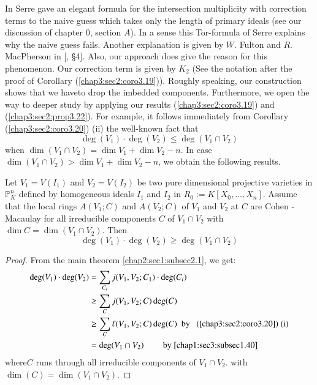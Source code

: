 \setcounter{remark}{26}
\begin{remark}\label{chap3:sec2:rem3.27}
  In \cite{72} Serre gave an elegant formula for the intersection
  multiplicity with correction terms to the naive guess which takes
  only the length of primary ideals (see our discussion of chapter
  $0$, section $A$). In a sense this Tor-formula of Serre explains why
  the  naive guess fails. Another explanation is given by $W$. Fulton
  and $R$. MacPherson in [\cite{19}, \S 4]. Also, our approach does give the
  reason for this phenomenon. Our correction term is given by $K_2$ 
  (See the notation after the proof of Corollary (\ref{chap3:sec2:coro3.19})). Roughly
  speaking, our construction shows that we have\pageoriginale to drop the imbedded
  components. Furthermore, we open the way to deeper study by applying
  our results (\ref{chap3:sec2:coro3.19}) and
  (\ref{chap3:sec2:prop3.22}). For example, it follows immediately 
  from Corollary (\ref{chap3:sec2:coro3.20}) (ii) the well-known fact that  
  $$ 
  \deg(V_1)\cdot\deg (V_2) \leq \deg (V_1 \cap V_2)
  $$
  when $\dim (V_1 \cap V_2) = \dim V_1 + \dim V_2 -n$. In case $\dim(V_1
  \cap V_2) > \dim V_1 +  \dim V_2 -n$, we obtain the following
  results. 
\end{remark}

\setcounter{proposition}{27}
\begin{proposition}\label{chap3:sec2:prop3.28}
  Let $ V_1= V(I_1)$ and $ V_2 =V(I_2)$ 
    be two pure dimensional projective varieties in $ \mathbb{P}_K^n$
  defined by homogeneous ideals  $I_1$ and  $I_2$
   in  $R_0:= K[X_0,\ldots,X_n]$. Assume that the
   local rings  $ A(V_1;C)$ and $A(V_2;C)$ of
  $V_1$  and  $V_2$ at  $C$  are Cohen
    -Macaulay for all irreducible components  $C$ of  $ V_1
  \cap V_2$  with  $\dim C = \dim (V_1\cap V_2)$. Then 
  $$
  \deg (V_1) \cdot \deg (V_2) \ge  \deg (V_1 \cap V_2)
  $$
\end{proposition}

\begin{proof}
  From the main theorem \ref{chap2:sec1:subsec2.1}, we get:
  \begin{align*}
    \deg (V_1) \cdot \deg (V_2)&= \sum_{C_{i}}j(V_1, V_2; C_1) \cdot \deg (C_i)\\
    &\ge \sum _C j (V_1, V_2;C) \deg (C)\\
    & \ge \sum_C \ell (V_1, V_2; C) \deg (C) ~\text{ by ~
    (\ref{chap3:sec2:coro3.20}) (i)}\\
    &= \deg (V_1 \cap V_2 ) \quad \quad \text{ by  \ref{chap1:sec3:subsec1.40}}
  \end{align*}
  where\pageoriginale $C$ runs through all irreducible components of $V_1 \cap
  V_2$. with $\dim (C) = \dim (V_1 \cap V_2)$. 
\end{proof}

